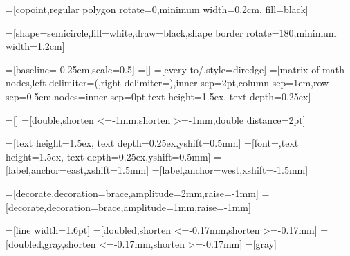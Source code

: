 =[copoint,regular polygon rotate=0,minimum width=0.2cm, fill=black]

=[shape=semicircle,fill=white,draw=black,shape border rotate=180,minimum width=1.2cm]

%
%


=[baseline=-0.25em,scale=0.5]
=[] %
=[every to/.style={diredge}]
=[matrix of math nodes,left delimiter=(,right delimiter=),inner sep=2pt,column sep=1em,row sep=0.5em,nodes={inner sep=0pt},text height=1.5ex, text depth=0.25ex]


=[]
=[double,shorten <=-1mm,shorten >=-1mm,double distance=2pt]

=[text height=1.5ex, text depth=0.25ex,yshift=0.5mm]
=[font=\footnotesize,text height=1.5ex, text depth=0.25ex,yshift=0.5mm]
=[label,anchor=east,xshift=1.5mm]
=[label,anchor=west,xshift=-1.5mm]

\renewcommand{\phantombox}[1]{\tikz[baseline=(current bounding box).east]{\path [use as bounding box] (0,0) rectangle #1;}}
=[decorate,decoration={brace,amplitude=2mm,raise=-1mm}]
=[decorate,decoration={brace,amplitude=1mm,raise=-1mm}]

=[line width=1.6pt] %
=[doubled,shorten <=-0.17mm,shorten >=-0.17mm]
=[doubled,gray,shorten <=-0.17mm,shorten >=-0.17mm]
=[gray]%

